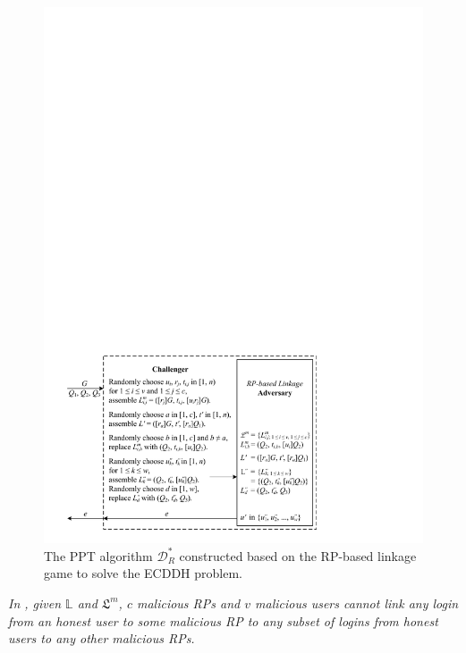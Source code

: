 \begin{figure}[tb]
  \centering
  \includegraphics[width=1.0\linewidth]{fig/rp-linkage-game.pdf}
  \caption{The PPT algorithm $\mathcal{D}^*_R$ constructed based on the RP-based linkage game to solve the ECDDH problem.}
  \label{fig:dalgorithm}
\end{figure}


\begin{thm}[RP Unlinkability]
\emph{In \usso, given $\mathbb{L}$ and $\mathfrak{L}^m$, $c$ malicious RPs and $v$ malicious users cannot link any login from an honest user to some malicious RP to any subset of logins from honest users to any other malicious RPs.}\label{thm-rp-unlinkability}
\end{thm}
\vspace{-1mm}

